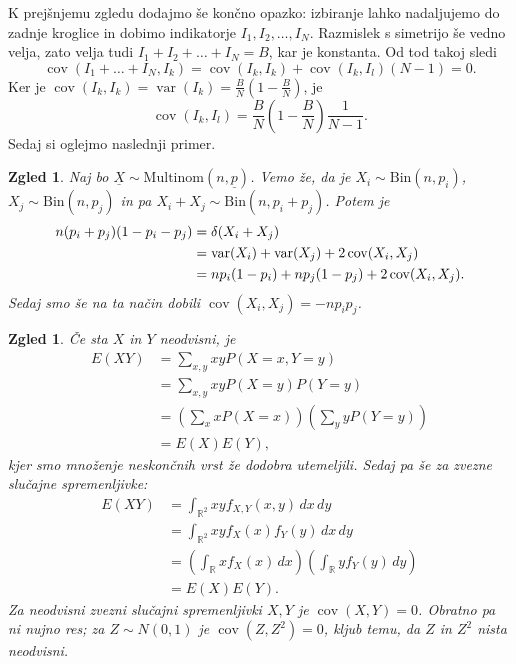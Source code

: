 \documentclass[10pt, a4paper]{article}
\newtheorem{zgled}[izr]{Zgled}
\newcommand{\R}{\mathbb {R}}
\DeclareMathOperator{\cov}{cov}
\DeclareMathOperator{\vari}{var}
\begin{document}
K prejšnjemu zgledu dodajmo še končno opazko: izbiranje lahko nadaljujemo 
do zadnje kroglice in dobimo indikatorje $I_1, I_2, \dots, I_N$.
Razmislek s simetrijo še vedno velja, zato velja tudi 
$I_1 + I_2 + \dots + I_N = B$, kar je konstanta.
Od tod takoj sledi 
\begin{equation*}
  \cov(I_1 + \dots + I_N, I_k) = \cov(I_k, I_k) + \cov(I_k, I_l) (N - 1) = 0.
\end{equation*}
Ker je $\cov(I_k, I_k) = \vari(I_k) = \frac{B}{N} \left(1 - \frac{B}{N}\right)$,
je $$\cov(I_k, I_l) = \frac{B}{N} \left(1 - \frac{B}{N}\right) \frac{1}{N - 1}.$$
Sedaj si oglejmo naslednji primer.
\begin{zgled}
  Naj bo $\underline{X} \sim \mathrm{Multinom} (n, \underline{p})$.
  Vemo že, da je $X_i \sim \mathrm{Bin} (n, p_i)$, $X_j \sim \mathrm{Bin} (n, p_j)$ in pa 
  $X_i + X_j \sim \mathrm{Bin} (n, p_i + p_j)$. Potem je 
  \begin{align*}
    n(p_i + p_j) (1 - p_i - p_j) &= \var(X_i + X_j)\\
    &= \vari(X_i) + \vari(X_j) + 2 \cov(X_i, X_j)\\
    &= np_i(1 - p_i) + np_j (1 - p_j) + 2 \cov(X_i, X_j).
  \end{align*}
  Sedaj smo še na ta način dobili $\cov(X_i, X_j) = -n p_i p_j$.
\end{zgled}

\begin{zgled}
  Če sta $X$ in $Y$ neodvisni, je 
  \begin{align*}
    E(XY) &= \sum_{x, y} xy P(X = x, Y = y)\\
    &= \sum_{x, y} xy P(X = y) P(Y = y)\\
    &= \left(\sum_x xP(X = x)\right) \left(\sum_y yP(Y = y)\right)\\
    &= E(X) E(Y),
  \end{align*}
  kjer smo množenje neskončnih vrst že dodobra utemeljili.
  Sedaj pa še za zvezne slučajne spremenljivke:
  \begin{align*}
    E(XY) &= \int_{\R^2} xy f_{X, Y} (x, y)\, dx\, dy\\
    &= \int_{\R^2} xy f_X (x) f_Y (y)\, dx\, dy\\
    &= \left(\int_{\R} x f_X (x)\, dx\right) \left(\int_{\R} y f_Y (y)\, dy\right)\\
    &= E(X) E(Y).
  \end{align*}
  Za neodvisni zvezni slučajni spremenljivki $X, Y$ je $\cov(X, Y) = 0$.
  Obratno pa ni nujno res; za $Z \sim N(0, 1)$ je $\cov(Z, Z^2) = 0$,
  kljub temu, da $Z$ in $Z^2$ nista neodvisni.
\end{zgled}
\end{document}
